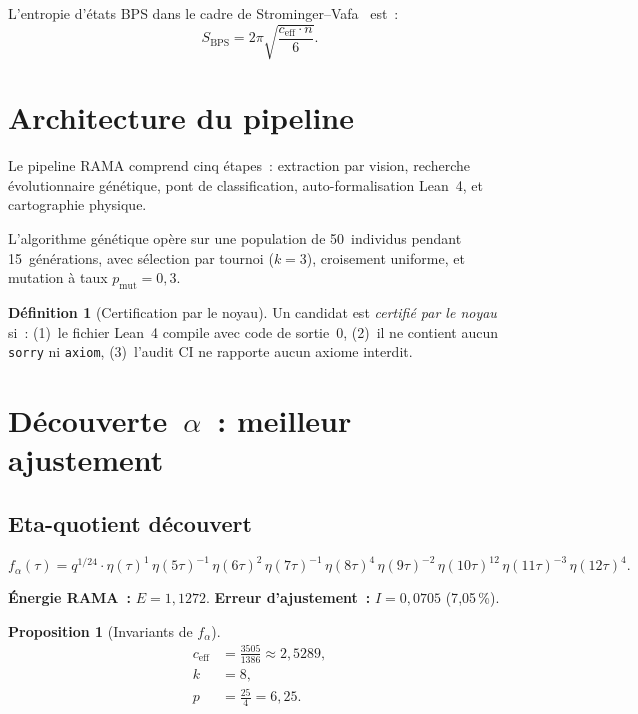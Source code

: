 \documentclass[11pt,a4paper]{article}
\theoremstyle{plain}
\newtheorem{proposition}[theorem]{Proposition}
\theoremstyle{definition}
\newtheorem{definition}[theorem]{Définition}
\newcommand{\ceff}{c_{\mathrm{eff}}}
\newcommand{\RAMA}{\textsc{RAMA}}
\begin{document}
L'entropie d'états BPS dans le cadre de
Strominger--Vafa~\cite{strominger_vafa_1996} est~:
\begin{equation}
  S_{\mathrm{BPS}} = 2\pi \sqrt{\frac{\ceff \cdot n}{6}}.
\end{equation}

\section{Architecture du pipeline}
\label{sec:pipeline}

Le pipeline \RAMA{} comprend cinq étapes~: extraction
par vision, recherche évolutionnaire génétique, pont de
classification, auto-formalisation Lean~4, et
cartographie physique.

L'algorithme génétique opère sur une population de
50~individus pendant 15~générations, avec sélection par
tournoi ($k=3$), croisement uniforme, et mutation à
taux $p_{\mathrm{mut}} = 0{,}3$.

\begin{definition}[Certification par le noyau]
Un candidat est \emph{certifié par le noyau} si~:
(1)~le fichier Lean~4 compile avec code de sortie~0,
(2)~il ne contient aucun \texttt{sorry} ni \texttt{axiom},
(3)~l'audit CI ne rapporte aucun axiome interdit.
\end{definition}

\section{Découverte~$\alpha$~: meilleur ajustement}
\label{sec:candidate_alpha}

\subsection{Eta-quotient découvert}

\begin{equation}
  f_\alpha(\tau) = q^{1/24} \cdot
  \eta(\tau)^{1} \,
  \eta(5\tau)^{-1} \,
  \eta(6\tau)^{2} \,
  \eta(7\tau)^{-1} \,
  \eta(8\tau)^{4} \,
  \eta(9\tau)^{-2} \,
  \eta(10\tau)^{12} \,
  \eta(11\tau)^{-3} \,
  \eta(12\tau)^{4}.
\end{equation}

\textbf{Énergie RAMA~:} $E = 1{,}1272$. \quad
\textbf{Erreur d'ajustement~:} $I = 0{,}0705$ (7{,}05\,\%).

\begin{proposition}[Invariants de $f_\alpha$]
\begin{align}
  \ceff &= \frac{3505}{1386} \approx 2{,}5289, \\
  k &= 8, \\
  p &= \frac{25}{4} = 6{,}25.
\end{align}
\end{proposition}
\end{document}
